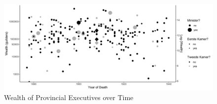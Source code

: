 
\clearpage



\clearpage

\begin{landscape}

\clearpage


\begin{figure}
    \centering
    \includegraphics[scale = 0.17]{figures/wealth_dep.png}
    \caption{Wealth of Provincial Executives over Time}
    \label{fig:avgwealthprovexec}
\end{figure}
\clearpage
\end{landscape}




